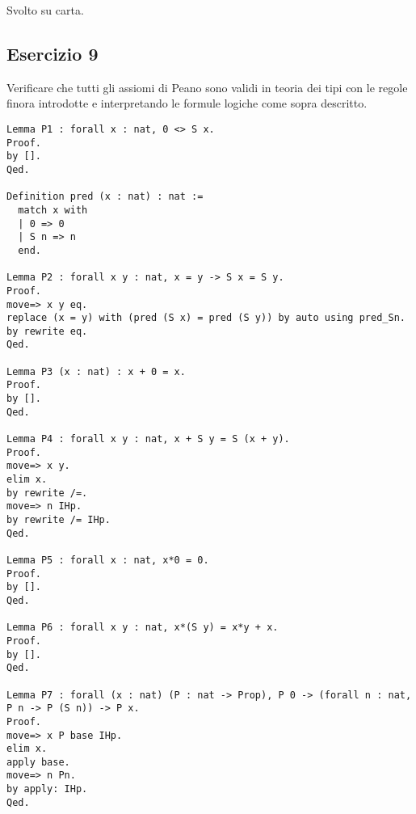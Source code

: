 Svolto su carta.

\subsection{Esercizio 9}

Verificare che tutti gli assiomi di Peano sono validi in teoria dei tipi con le
regole finora introdotte e interpretando le formule logiche come sopra
descritto.

\begin{lstlisting}[language=Coq]
Lemma P1 : forall x : nat, 0 <> S x.
Proof.
by [].
Qed.

Definition pred (x : nat) : nat :=
  match x with
  | 0 => 0
  | S n => n
  end.

Lemma P2 : forall x y : nat, x = y -> S x = S y.
Proof.
move=> x y eq.
replace (x = y) with (pred (S x) = pred (S y)) by auto using pred_Sn.
by rewrite eq.
Qed.

Lemma P3 (x : nat) : x + 0 = x.
Proof.
by [].
Qed.

Lemma P4 : forall x y : nat, x + S y = S (x + y).
Proof.
move=> x y.
elim x.
by rewrite /=.
move=> n IHp.
by rewrite /= IHp.
Qed.

Lemma P5 : forall x : nat, x*0 = 0.
Proof.
by [].
Qed.

Lemma P6 : forall x y : nat, x*(S y) = x*y + x.
Proof.
by [].
Qed.

Lemma P7 : forall (x : nat) (P : nat -> Prop), P 0 -> (forall n : nat, P n -> P (S n)) -> P x.
Proof.
move=> x P base IHp.
elim x.
apply base.
move=> n Pn.
by apply: IHp.
Qed.
\end{lstlisting}
